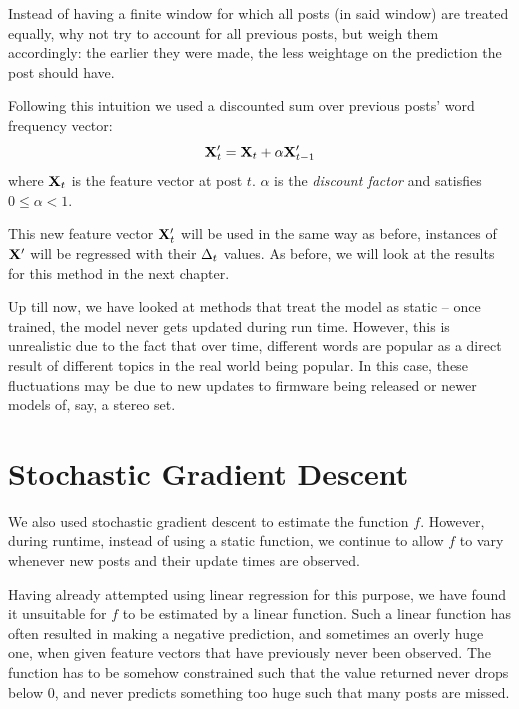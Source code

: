 Instead of having a finite window for which all posts (in said window) are 
treated equally, why not try to account for all previous posts, but weigh them 
accordingly: the earlier they were made, the less weightage on the prediction 
the post should have.

Following this intuition we used a discounted sum over previous posts' word 
frequency vector:
\[
	\mathbf{X}'_t = \mathbf{X}_t + \alpha \mathbf{X}'_{t-1}
\]
where $\mathbf{X}_t$ is the feature vector at post $t$. $\alpha$ is the \emph{discount 
factor} and satisfies $0 \leq \alpha < 1$.

This new feature vector $\mathbf{X}'_t$ will be used in the same way as before, 
instances of $\mathbf{X}'$ will be regressed with their $\Delta_t$ values. As before, we will 
look at the results for this method in the next chapter.

Up till now, we have looked at methods that treat the model as static -- once 
trained, the model never gets updated during run time. However, this is 
unrealistic due to the fact that over time, different words are popular as a 
direct result of different topics in the real world being popular. In this case, 
these fluctuations may be due to new updates to firmware being released or newer 
models of, say, a stereo set.

\section{Stochastic Gradient Descent}
We also used stochastic gradient descent to estimate the function $f$.  However, 
during runtime, instead of using a static function, we continue to allow $f$ to 
vary whenever new posts and their update times are observed.

Having already attempted using linear regression for this purpose, we have found 
it unsuitable for $f$ to be estimated by a linear function. Such a linear 
function has often resulted in making a negative prediction, and sometimes an 
overly huge one, when given feature vectors that have previously never been 
observed. The function has to be somehow constrained such that the value 
returned never drops below 0, and never predicts something too huge such that 
many posts are missed.



